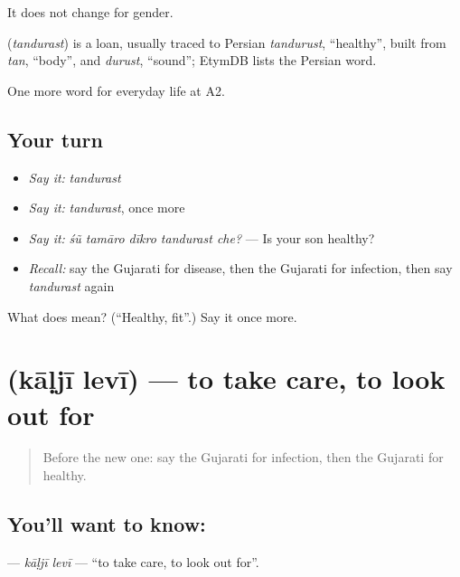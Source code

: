 It does not change for gender.

\begin{cousinweb}
\textbf{} (\emph{tandurast}) is a loan, usually traced to Persian \emph{tandurust}, \textquotedblleft{}healthy\textquotedblright{}, built from \emph{tan}, \textquotedblleft{}body\textquotedblright{}, and \emph{durust}, \textquotedblleft{}sound\textquotedblright{}; EtymDB lists the Persian word.
\end{cousinweb}

\begin{grammarlens}[title={What you've built}]
One more word for everyday life at A2.
\end{grammarlens}

\subsection*{Your turn}
\begin{itemize}
\raggedright
  \item \emph{Say it:} \emph{tandurast}
  \item \emph{Say it:} \emph{tandurast}, once more
  \item \emph{Say it:} \emph{śũ tamāro dīkro tandurast che?} — Is your son healthy?
  \item \emph{Recall:} say the Gujarati for disease, then the Gujarati for infection, then say \emph{tandurast} again
\end{itemize}

\begin{tcolorbox}[breakable,colback=teal!4,colframe=teal!35!black,title={Before you move on}]
What does  mean? (\textquotedblleft{}Healthy, fit\textquotedblright{}.) Say it once more.
\end{tcolorbox}
\section[\texorpdfstring{\gu{કાળજી} \gu{લેવી} (kāḷjī levī)}{કાળજી લેવી (kāḷjī levī)}]{  (kāḷjī levī) — to take care, to look out for}

\label{lesson:GU-C232-kalji-levi}



\begin{quote}
Before the new one: say the Gujarati for infection, then the Gujarati for healthy.
\end{quote}

\subsection*{You'll want to know:  }
\textbf{ } — \emph{kāḷjī levī} — \textquotedblleft{}to take care, to look out for\textquotedblright{}.

